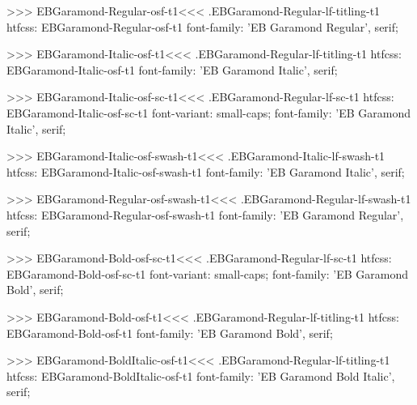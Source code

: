 {{{{{{{>>>
\<EBGaramond-Regular-osf-t1\><<<
.EBGaramond-Regular-lf-titling-t1
htfcss:  EBGaramond-Regular-osf-t1  font-family: 'EB Garamond Regular', serif;

>>>
\<EBGaramond-Italic-osf-t1\><<<
.EBGaramond-Regular-lf-titling-t1
htfcss:  EBGaramond-Italic-osf-t1  font-family: 'EB Garamond Italic', serif;

>>>
\<EBGaramond-Italic-osf-sc-t1\><<<
.EBGaramond-Regular-lf-sc-t1
htfcss:  EBGaramond-Italic-osf-sc-t1  font-variant: small-caps; font-family: 'EB Garamond Italic', serif;

>>>
\<EBGaramond-Italic-osf-swash-t1\><<<
.EBGaramond-Italic-lf-swash-t1
htfcss:  EBGaramond-Italic-osf-swash-t1  font-family: 'EB Garamond Italic', serif;

>>>
\<EBGaramond-Regular-osf-swash-t1\><<<
.EBGaramond-Regular-lf-swash-t1
htfcss:  EBGaramond-Regular-osf-swash-t1  font-family: 'EB Garamond Regular', serif;

>>>
\<EBGaramond-Bold-osf-sc-t1\><<<
.EBGaramond-Regular-lf-sc-t1
htfcss:  EBGaramond-Bold-osf-sc-t1  font-variant: small-caps; font-family: 'EB Garamond Bold', serif;

>>>
\<EBGaramond-Bold-osf-t1\><<<
.EBGaramond-Regular-lf-titling-t1
htfcss:  EBGaramond-Bold-osf-t1  font-family: 'EB Garamond Bold', serif;

>>>
\<EBGaramond-BoldItalic-osf-t1\><<<
.EBGaramond-Regular-lf-titling-t1
htfcss:  EBGaramond-BoldItalic-osf-t1  font-family: 'EB Garamond Bold Italic', serif;

}}}}}}}
